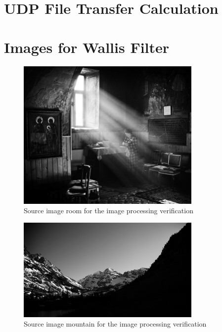 \section{UDP File Transfer Calculation} \label{app:uftcalc}


\section{Images for Wallis Filter} \label{app:images_wallis}
\begin{figure}[H]
    \centering
    \includegraphics[width=0.8\textwidth]{appendices/ref_room.png}
    \caption{Source image room for the image processing verification}
    \label{fig:ref_room}
\end{figure}

\begin{figure}[H]
    \centering
    \includegraphics[width=0.8\textwidth]{appendices/ref_mountain.png}
    \caption{Source image mountain for the image processing verification}
    \label{fig:ref_mountain}
\end{figure}

